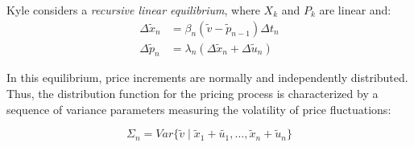 \documentclass{beamer}
\begin{document}
\begin{frame}
    Kyle considers a \textit{recursive linear equilibrium}, where $X_k$ and $P_k$ are linear and:
    \begin{align}
        \Delta \tilde{x}_n &= \beta_n(\tilde{v} - \tilde{p}_{n-1}) \Delta t_n \\
        \Delta \tilde{p}_n &= \lambda_n(\Delta \tilde{x}_n + \Delta \tilde{u}_n)
    \end{align}

    In this equilibrium, price increments are normally and independently distributed. Thus, the distribution function for the pricing process is characterized by a sequence of variance parameters measuring the volatility of price fluctuations:

        \begin{equation}
            \Sigma_n = Var \{\tilde{v} \mid \tilde{x}_1 + \tilde{u_1}, \ldots, \tilde{x}_n + \tilde{u}_n \}
        \end{equation}

\end{frame}
\end{document}
